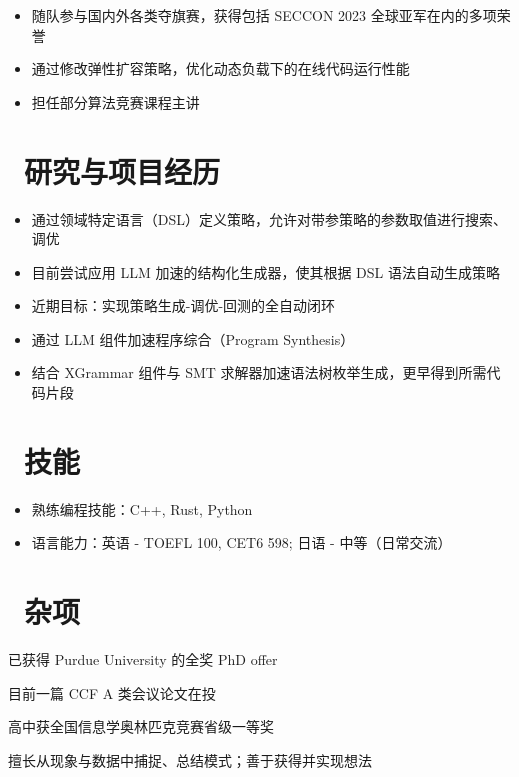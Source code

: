 \documentclass{resume}
\begin{document}
\begin{itemize}[parsep=0.5ex]
  \item 随队参与国内外各类夺旗赛，获得包括 SECCON 2023 全球亚军在内的多项荣誉
\end{itemize}

\begin{itemize}[parsep=0.5ex]
  \item 通过修改弹性扩容策略，优化动态负载下的在线代码运行性能
  \item 担任部分算法竞赛课程主讲
\end{itemize}

\section{\faCogs\ 研究与项目经历}

\begin{itemize}[parsep=0.5ex]
  \item 通过领域特定语言（DSL）定义策略，允许对带参策略的参数取值进行搜索、调优
  \item 目前尝试应用 LLM 加速的结构化生成器，使其根据 DSL 语法自动生成策略
  \item 近期目标：实现策略生成-调优-回测的全自动闭环
\end{itemize}

\begin{itemize}[parsep=0.5ex]
  \item 通过 LLM 组件加速程序综合（Program Synthesis）
  \item 结合 XGrammar 组件与 SMT 求解器加速语法树枚举生成，更早得到所需代码片段
\end{itemize}

\section{\faCogs\ 技能}
\begin{itemize}[parsep=0.5ex]
  \item 熟练编程技能：C++, Rust, Python
  \item 语言能力：英语 - TOEFL 100, CET6 598; 日语 - 中等（日常交流）
\end{itemize}

\section{\faInfo\ 杂项}
\begin{description}[parsep=0.5ex]
  \item[升学] 已获得 Purdue University 的全奖 PhD offer
  \item[论文] 目前一篇 CCF A 类会议论文在投
  \item[竞赛] 高中获全国信息学奥林匹克竞赛省级一等奖
  \item[特长] 擅长从现象与数据中捕捉、总结模式；善于获得并实现想法
\end{description}
\end{document}
